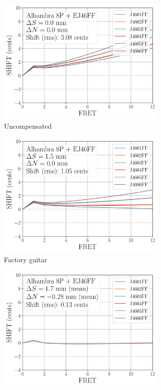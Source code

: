  \begin{figure}
   \centering
   \begin{subfigure}[b]{0.46\textwidth}
    \centering
    \includegraphics[width=3.25in]{../figures/shift_alhambra8p_ej46ff_null}
    \caption{Uncompensated}
    \label{fig:shift_alhambra8p_ej46ff_null}
   \end{subfigure}
   \hspace{0.25in}
   \begin{subfigure}[b]{0.46\textwidth}
    \centering
    \includegraphics[width=3.25in]{../figures/shift_alhambra8p_ej46ff_factory}
    \caption{Factory guitar}
    \label{fig:shift_alhambra8p_ej46ff_factory}
   \end{subfigure}
   \par\vspace{0.25in}
   \begin{subfigure}[b]{0.46\textwidth}
    \centering
    \includegraphics[width=3.25in]{../figures/shift_alhambra8p_ej46ff_full}

\end{subfigure}
\end{figure}
